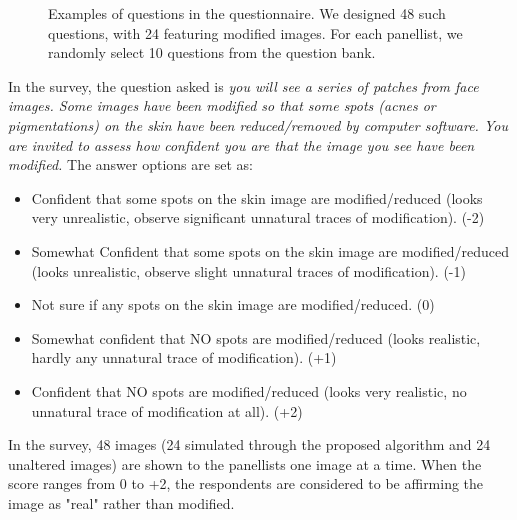 \begin{spacing}{1.5}
\begin{figure}[t!]
    \caption{Examples of questions in the questionnaire. We designed 48 such questions, with 24 featuring modified images. For each panellist, we randomly select 10 questions from the question bank.}
    \label{fig:sample_form}
\end{figure}
In the survey, the question asked is \textit{you will see a series of patches from face images. Some images have been modified so that some spots (acnes or pigmentations) on the skin have been reduced/removed by computer software. You are invited to assess how confident you are that the image you see have been modified.} The answer options are set as:
\begin{itemize}
    \item Confident that some spots on the skin image are modified/reduced (looks very unrealistic, observe significant unnatural traces of modification). (-2)
    \item Somewhat Confident that some spots on the skin image are modified/reduced (looks unrealistic, observe slight unnatural traces of modification). (-1)
    \item Not sure if any spots on the skin image are modified/reduced. (0)
    \item Somewhat confident that NO spots are modified/reduced (looks realistic, hardly any unnatural trace of modification). (+1)
    \item Confident that NO spots are modified/reduced (looks very realistic, no unnatural trace of modification at all). (+2)
\end{itemize}

In the survey, 48 images (24 simulated through the proposed algorithm and 24 unaltered images) are shown to the panellists one image at a time. When the score ranges from 0 to +2, the respondents are considered to be affirming the image as "real" rather than modified.
\end{spacing}
\newpage
